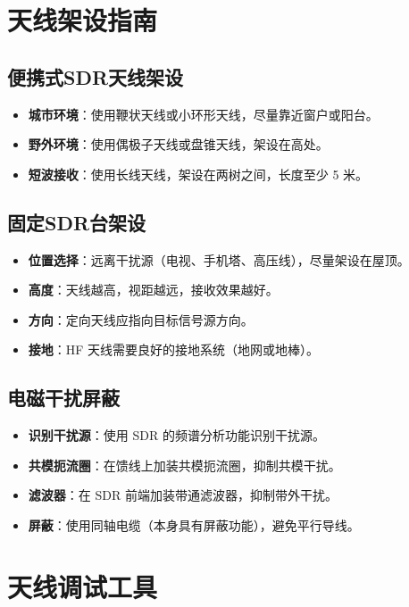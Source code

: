 \documentclass[12pt,UTF8]{ctexbook}
\begin{document}
\section{天线架设指南}
\label{sec:antenna_install}

\subsection{便携式SDR天线架设}
\begin{itemize}[leftmargin=2cm]
    \item \textbf{城市环境}：使用鞭状天线或小环形天线，尽量靠近窗户或阳台。
    \item \textbf{野外环境}：使用偶极子天线或盘锥天线，架设在高处。
    \item \textbf{短波接收}：使用长线天线，架设在两树之间，长度至少 5 米。
\end{itemize}

\subsection{固定SDR台架设}
\begin{itemize}[leftmargin=2cm]
    \item \textbf{位置选择}：远离干扰源（电视、手机塔、高压线），尽量架设在屋顶。
    \item \textbf{高度}：天线越高，视距越远，接收效果越好。
    \item \textbf{方向}：定向天线应指向目标信号源方向。
    \item \textbf{接地}：HF 天线需要良好的接地系统（地网或地棒）。
\end{itemize}

\subsection{电磁干扰屏蔽}
\begin{itemize}[leftmargin=2cm]
    \item \textbf{识别干扰源}：使用 SDR 的频谱分析功能识别干扰源。
    \item \textbf{共模扼流圈}：在馈线上加装共模扼流圈，抑制共模干扰。
    \item \textbf{滤波器}：在 SDR 前端加装带通滤波器，抑制带外干扰。
    \item \textbf{屏蔽}：使用同轴电缆（本身具有屏蔽功能），避免平行导线。
\end{itemize}

\section{天线调试工具}
\label{sec:antenna_test}
\end{document}
